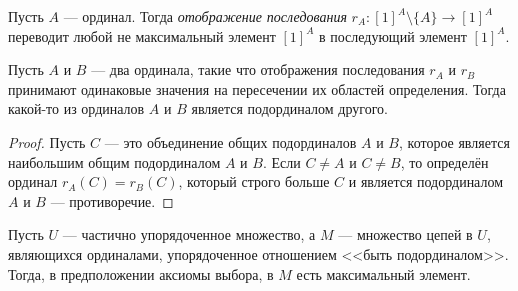 \documentclass[
	extrafontsizes,
	11pt,
	hyphens,
]{memoir}
\begin{document}

\begin{definition}
Пусть \(A\) --- ординал. Тогда \emph{отображение последования} \(r_A : [1]^A \setminus \{A\} \to [1]^A\) переводит любой не максимальный элемент \([1]^A\) в последующий элемент \([1]^A\).
\end{definition}

\begin{lemma}
Пусть \(A\) и \(B\) --- два ординала, такие что отображения последования \(r_A\) и \(r_B\) принимают одинаковые значения на пересечении их областей определения. Тогда какой-то из ординалов \(A\) и \(B\) является подординалом другого.
\end{lemma}


\begin{proof}
Пусть \(C\) --- это объединение общих подординалов \(A\) и \(B\), которое является наибольшим общим подординалом \(A\) и \(B\). Если \(C \neq A\) и \(C \neq B\), то определён ординал \(r_A(C) = r_B(C)\), который строго больше \(C\) и является подординалом \(A\) и \(B\) --- противоречие.
\end{proof}

\begin{theorem}
Пусть \(U\) --- частично упорядоченное множество, а \(M\) --- множество цепей в \(U\), являющихся ординалами, упорядоченное отношением <<быть подординалом>>.
\label{thm:OrdZornLemma}
Тогда, в предположении аксиомы выбора, в \(M\) есть максимальный элемент.
\end{theorem}
\end{document}
